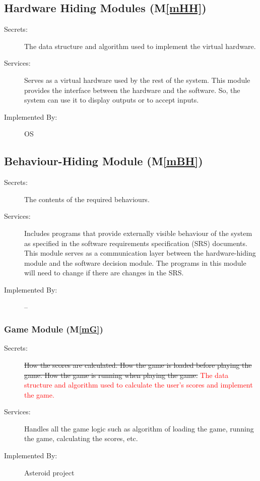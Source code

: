 \documentclass[12pt, titlepage]{article}
\newcommand{\mref}[1]{M\ref{#1}}
\begin{document}
\subsection{Hardware Hiding Modules (\mref{mHH})}

\begin{description}
\item[Secrets:]The data structure and algorithm used to implement the virtual
  hardware.
\item[Services:]Serves as a virtual hardware used by the rest of the
  system. This module provides the interface between the hardware and the
  software. So, the system can use it to display outputs or to accept inputs.
\item[Implemented By:] OS
\end{description}

\subsection{Behaviour-Hiding Module  (\mref{mBH})}

\begin{description}
\item[Secrets:]The contents of the required behaviours.
\item[Services:]Includes programs that provide externally visible behaviour of
  the system as specified in the software requirements specification (SRS)
  documents. This module serves as a communication layer between the
  hardware-hiding module and the software decision module. The programs in this
  module will need to change if there are changes in the SRS.
\item[Implemented By:] --
\end{description}

\subsubsection{Game Module (\mref{mG})}

\begin{description}
\item[Secrets:]\sout{How the scores are calculated. How the game is loaded before playing the game.  How the game is running when playing the game.}
\textcolor{red}{The data structure and algorithm used to calculate the user's scores and implement the game.}
\item[Services:]Handles all the game logic such as algorithm of loading the game, running the game, calculating the scores, etc.
\item[Implemented By:] Asteroid project
\end{description}
\end{document}
